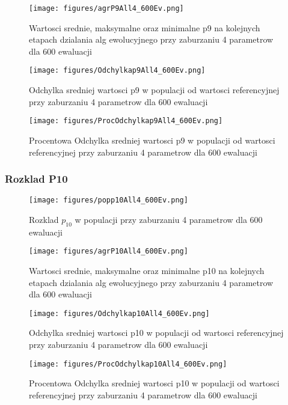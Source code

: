 \documentclass[]{article}
\begin{document}
\begin{figure}[htbp]
\centering
\texttt{[image: figures/agrP9All4\_600Ev.png]}
\caption{Wartosci srednie, maksymalne oraz minimalne p9 na kolejnych
etapach dzialania alg ewolucyjnego przy zaburzaniu 4 parametrow dla 600
ewaluacji}
\end{figure}

\begin{figure}[htbp]
\centering
\texttt{[image: figures/Odchylkap9All4\_600Ev.png]}
\caption{Odchylka sredniej wartosci p9 w populacji od wartosci
referencyjnej przy zaburzaniu 4 parametrow dla 600 ewaluacji}
\end{figure}

\begin{figure}[htbp]
\centering
\texttt{[image: figures/ProcOdchylkap9All4\_600Ev.png]}
\caption{Procentowa Odchylka sredniej wartosci p9 w populacji od
wartosci referencyjnej przy zaburzaniu 4 parametrow dla 600 ewaluacji}
\end{figure}

\newpage

\subsubsection{Rozklad P10}\label{rozklad-p10-1}

\begin{figure}[htbp]
\centering
\texttt{[image: figures/popp10All4\_600Ev.png]}
\caption{Rozklad \(p_{10}\) w populacji przy zaburzaniu 4 parametrow dla
600 ewaluacji}
\end{figure}

\begin{figure}[htbp]
\centering
\texttt{[image: figures/agrP10All4\_600Ev.png]}
\caption{Wartosci srednie, maksymalne oraz minimalne p10 na kolejnych
etapach dzialania alg ewolucyjnego przy zaburzaniu 4 parametrow dla 600
ewaluacji}
\end{figure}

\begin{figure}[htbp]
\centering
\texttt{[image: figures/Odchylkap10All4\_600Ev.png]}
\caption{Odchylka sredniej wartosci p10 w populacji od wartosci
referencyjnej przy zaburzaniu 4 parametrow dla 600 ewaluacji}
\end{figure}

\begin{figure}[htbp]
\centering
\texttt{[image: figures/ProcOdchylkap10All4\_600Ev.png]}
\caption{Procentowa Odchylka sredniej wartosci p10 w populacji od
wartosci referencyjnej przy zaburzaniu 4 parametrow dla 600 ewaluacji}
\end{figure}
\end{document}
